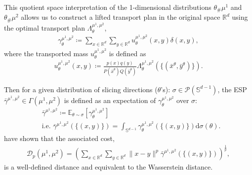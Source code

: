 This quotient space interpretation of the 1-dimensional distributions $\theta_\#\mu^1$ and $\theta_\#\mu^2$ allows us to construct a lifted transport plan in the original space $\mathbb{R}^d$ using the optimal transport plan $\Lambda_\theta^{\mu^1, \mu^2}$,
\begin{align}
\label{eq: gamma_theta}
    \gamma_\theta^{\mu^1, \mu^2} \coloneqq \sum_{x\in\mathbb{R}^d}\sum_{y\in\mathbb{R}^d}u_\theta^{\mu^1, \mu^2}(x, y)\delta(x, y),
\end{align}
where the transported mass $u_\theta^{\mu^1, \mu^2}$ is defined as
\vspace{-.1in}
\begin{align}
    \label{eq: lifted theta}
    \nonumber u_\theta^{\mu^1, \mu^2}(x, y) \coloneqq
    \frac{p(x)q(y)}{P(\bar{x}^\theta)Q(\bar{y}^\theta)}\Lambda_\theta^{\mu^1, \mu^2}(\{(\bar{x}^\theta, \bar{y}^\theta)\}).
\end{align}


Then for a given distribution of slicing directions ($\theta$'s): $\sigma\in\mathcal{P}(\mathbb{S}^{d-1})$, the ESP $\bar{\gamma}^{\mu^1, \mu^2}\in\Gamma(\mu^1, \mu^2)$ is defined as an expectation of $\gamma_\theta^{\mu^1, \mu^2}$ over $\sigma$:
\begin{align}
    &\bar{\gamma}^{\mu^1, \mu^2} \coloneqq \mathbb{E}_{\theta\sim \sigma}[\gamma_\theta^{\mu^1, \mu^2}]\quad \\
    &\nonumber\text{i.e. }\bar{\gamma}^{\mu^1, \mu^2}(\{(x, y)\})=\int_{\mathbb{S}^{d-1}}\gamma_\theta^{\mu^1, \mu^2}(\{(x, y)\})\text{d}\sigma(\theta).
\end{align}
\citet{liu2025expected} have shown that the associated cost, 
\begin{align*}
\mathcal{D}_p(\mu^1, \mu^2)=\left(\sum_{x\in\mathbb{R}^d}\sum_{y\in\mathbb{R}^d}\|x-y\|^p\bar{\gamma}^{\mu^1, \mu^2}(\{(x, y)\})\right)^\frac{1}{p},
\end{align*}
is a well-defined distance and equivalent to the Wasserstein distance.

